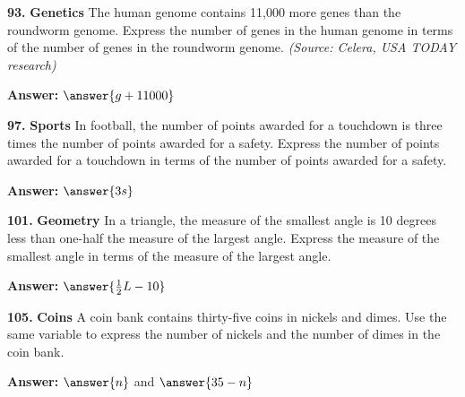 \documentclass{ximera}
\begin{document}
\begin{problem}
\textbf{93.} \textbf{Genetics} The human genome contains 11,000 more genes than the roundworm
  genome. Express the number of genes in the human genome in terms of the number of
  genes in the roundworm genome. \emph{(Source: Celera, USA TODAY research)}

\textbf{Answer:} $\answer{g+11000}$
\end{problem}

\begin{problem}
\textbf{97.} \textbf{Sports} In football, the number of points awarded for a touchdown is
  three times the number of points awarded for a safety. Express the number of points
  awarded for a touchdown in terms of the number of points awarded for a safety.

\textbf{Answer:} $\answer{3s}$
\end{problem}

\begin{problem}
\textbf{101.} \textbf{Geometry} In a triangle, the measure of the smallest angle is 10 degrees
  less than one-half the measure of the largest angle. Express the measure of the
  smallest angle in terms of the measure of the largest angle.

\textbf{Answer:} $\answer{\frac{1}{2}L-10}$
\end{problem}

\begin{problem}
\textbf{105.} \textbf{Coins} A coin bank contains thirty-five coins in nickels and dimes. Use
  the same variable to express the number of nickels and the number of dimes in the
  coin bank.

\textbf{Answer:} $\answer{n}$ and $\answer{35-n}$
\end{problem}
\end{document}
